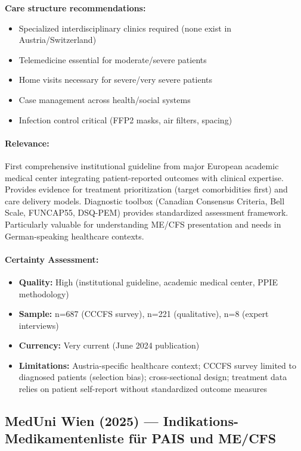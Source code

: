 \textbf{Care structure recommendations:}
\begin{itemize}
    \item Specialized interdisciplinary clinics required (none exist in Austria/Switzerland)
    \item Telemedicine essential for moderate/severe patients
    \item Home visits necessary for severe/very severe patients
    \item Case management across health/social systems
    \item Infection control critical (FFP2 masks, air filters, spacing)
\end{itemize}

\paragraph{Relevance:}
First comprehensive institutional guideline from major European academic medical center integrating patient-reported outcomes with clinical expertise. Provides evidence for treatment prioritization (target comorbidities first) and care delivery models. Diagnostic toolbox (Canadian Consensus Criteria, Bell Scale, FUNCAP55, DSQ-PEM) provides standardized assessment framework. Particularly valuable for understanding ME/CFS presentation and needs in German-speaking healthcare contexts.

\paragraph{Certainty Assessment:}
\begin{itemize}
    \item \textbf{Quality:} High (institutional guideline, academic medical center, PPIE methodology)
    \item \textbf{Sample:} n=687 (CCCFS survey), n=221 (qualitative), n=8 (expert interviews)
    \item \textbf{Currency:} Very current (June 2024 publication)
    \item \textbf{Limitations:} Austria-specific healthcare context; CCCFS survey limited to diagnosed patients (selection bias); cross-sectional design; treatment data relies on patient self-report without standardized outcome measures
\end{itemize}

\subsection{MedUni Wien (2025) --- Indikations-Medikamentenliste für PAIS und ME/CFS}

